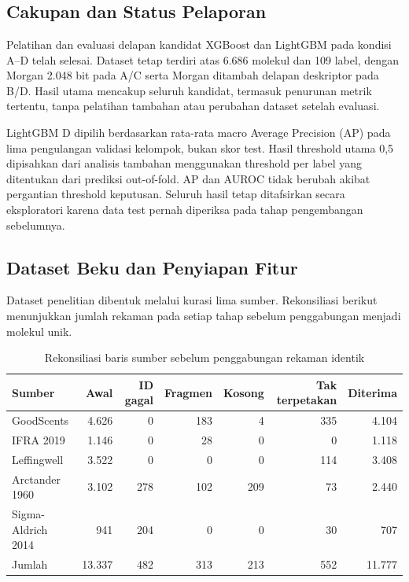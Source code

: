 \chapter{\babEmpat}

\section{Cakupan dan Status Pelaporan}
Pelatihan dan evaluasi delapan kandidat XGBoost dan LightGBM pada kondisi A--D telah selesai. Dataset tetap terdiri atas 6.686 molekul dan 109 label, dengan Morgan 2.048 bit pada A/C serta Morgan ditambah delapan deskriptor pada B/D. Hasil utama mencakup seluruh kandidat, termasuk penurunan metrik tertentu, tanpa pelatihan tambahan atau perubahan dataset setelah evaluasi.

LightGBM D dipilih berdasarkan rata-rata macro Average Precision (AP) pada lima pengulangan validasi kelompok, bukan skor test. Hasil threshold utama 0,5 dipisahkan dari analisis tambahan menggunakan threshold per label yang ditentukan dari prediksi out-of-fold. AP dan AUROC tidak berubah akibat pergantian threshold keputusan. Seluruh hasil tetap ditafsirkan secara eksploratori karena data test pernah diperiksa pada tahap pengembangan sebelumnya.

\section{Dataset Beku dan Penyiapan Fitur}
Dataset penelitian dibentuk melalui kurasi lima sumber. Rekonsiliasi berikut menunjukkan jumlah rekaman pada setiap tahap sebelum penggabungan menjadi molekul unik.
\begin{table}[htbp]
\centering
\caption{Rekonsiliasi baris sumber sebelum penggabungan rekaman identik}
\label{tab:audit_sumber}
\small
\setlength{\tabcolsep}{3pt}
\begin{tabular}{lrrrrrr}
\toprule
Sumber & Awal & ID gagal & Fragmen & Kosong & Tak terpetakan & Diterima \\
\midrule
GoodScents & 4.626 & 0 & 183 & 4 & 335 & 4.104 \\
IFRA 2019 & 1.146 & 0 & 28 & 0 & 0 & 1.118 \\
Leffingwell & 3.522 & 0 & 0 & 0 & 114 & 3.408 \\
Arctander 1960 & 3.102 & 278 & 102 & 209 & 73 & 2.440 \\
Sigma-Aldrich 2014 & 941 & 204 & 0 & 0 & 30 & 707 \\
\midrule
Jumlah & 13.337 & 482 & 313 & 213 & 552 & 11.777 \\
\bottomrule
\end{tabular}
\end{table}

